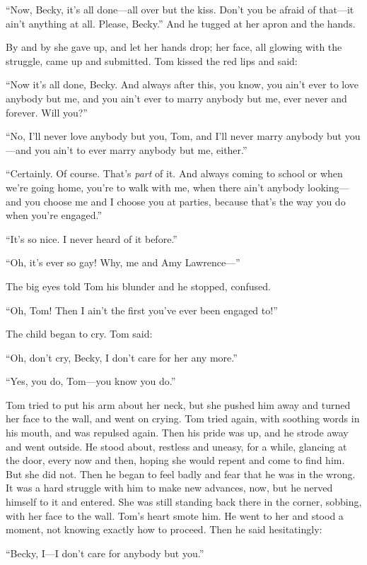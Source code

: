 \documentclass{book}
\begin{document}
“Now, Becky, it’s all done—all over but the kiss. Don’t you be afraid of that—it ain’t anything at all. Please, Becky.” And he tugged at her apron and the hands.

By and by she gave up, and let her hands drop; her face, all glowing with the struggle, came up and submitted. Tom kissed the red lips and said:

“Now it’s all done, Becky. And always after this, you know, you ain’t ever to love anybody but me, and you ain’t ever to marry anybody but me, ever never and forever. Will you?”

“No, I’ll never love anybody but you, Tom, and I’ll never marry anybody but you—and you ain’t to ever marry anybody but me, either.”

“Certainly. Of course. That’s \emph{part} of it. And always coming to school or when we’re going home, you’re to walk with me, when there ain’t anybody looking—and you choose me and I choose you at parties, because that’s the way you do when you’re engaged.”

“It’s so nice. I never heard of it before.”

“Oh, it’s ever so gay! Why, me and Amy Lawrence—”

The big eyes told Tom his blunder and he stopped, confused.

“Oh, Tom! Then I ain’t the first you’ve ever been engaged to!”

The child began to cry. Tom said:

“Oh, don’t cry, Becky, I don’t care for her any more.”

“Yes, you do, Tom—you know you do.”

Tom tried to put his arm about her neck, but she pushed him away and turned her face to the wall, and went on crying. Tom tried again, with soothing words in his mouth, and was repulsed again. Then his pride was up, and he strode away and went outside. He stood about, restless and uneasy, for a while, glancing at the door, every now and then, hoping she would repent and come to find him. But she did not. Then he began to feel badly and fear that he was in the wrong. It was a hard struggle with him to make new advances, now, but he nerved himself to it and entered. She was still standing back there in the corner, sobbing, with her face to the wall. Tom’s heart smote him. He went to her and stood a moment, not knowing exactly how to proceed. Then he said hesitatingly:

“Becky, I—I don’t care for anybody but you.”
\end{document}
